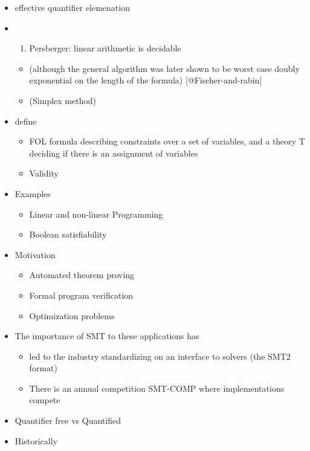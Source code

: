 \documentclass[]{article}
\providecommand{\tightlist}{%
  \setlength{\itemsep}{0pt}\setlength{\parskip}{0pt}}
\begin{document}
\begin{itemize}
\item
  effective quantifier elemenation
\item
  \begin{enumerate}
  \def\labelenumi{(\arabic{enumi})}
  \setcounter{enumi}{1928}
  \tightlist
  \item
    Persberger: linear arithmetic is decidable
  \end{enumerate}

  \begin{itemize}
  \tightlist
  \item
    (although the general algorithm was later shown to be worst case
    doubly exponential on the length of the formula)
    {[}@Fischer-and-rabin{]}
  \item
    (Simplex method)
  \end{itemize}
\item
  define

  \begin{itemize}
  \tightlist
  \item
    FOL formula describing constraints over a set of variables, and a
    theory T deciding if there is an assignment of variables
  \item
    Validity
  \end{itemize}
\item
  Examples

  \begin{itemize}
  \tightlist
  \item
    Linear and non-linear Programming
  \item
    Boolean satisfiability
  \end{itemize}
\item
  Motivation

  \begin{itemize}
  \tightlist
  \item
    Automated theorem proving
  \item
    Formal program verification
  \item
    Optimization problems
  \end{itemize}
\item
  The importance of SMT to these applications has

  \begin{itemize}
  \tightlist
  \item
    led to the industry standardizing on an interface to solvers (the
    SMT2 format)
  \item
    There is an annual competition SMT-COMP where implementations
    compete
  \end{itemize}
\item
  Quantifier free vs Quantified
\item
  Historically


\end{itemize}
\end{document}
